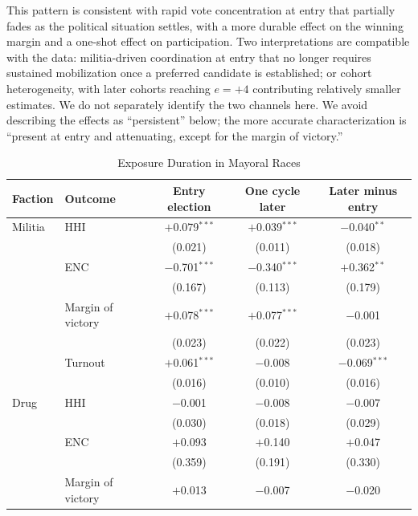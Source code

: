 \documentclass[11pt]{article}
\begin{document}
This pattern is consistent with rapid vote concentration at entry that partially fades as the political situation settles, with a more durable effect on the winning margin and a one-shot effect on participation. Two interpretations are compatible with the data: militia-driven coordination at entry that no longer requires sustained mobilization once a preferred candidate is established; or cohort heterogeneity, with later cohorts reaching $e=+4$ contributing relatively smaller estimates. We do not separately identify the two channels here. We avoid describing the effects as ``persistent'' below; the more accurate characterization is ``present at entry and attenuating, except for the margin of victory.''

\begin{table}[H]
\centering
\caption{Exposure Duration in Mayoral Races}\label{tab:duration}
\footnotesize
\begin{tabular}{@{}llccc@{}}
\toprule
Faction & Outcome & Entry election & One cycle later & Later minus entry \\
\midrule
Militia & HHI               & $+$0.079$^{***}$ & $+$0.039$^{***}$ & $-$0.040$^{**}$ \\
        &                   & (0.021)          & (0.011)          & (0.018) \\
        & ENC               & $-$0.701$^{***}$ & $-$0.340$^{***}$ & $+$0.362$^{**}$ \\
        &                   & (0.167)          & (0.113)          & (0.179) \\
        & Margin of victory & $+$0.078$^{***}$ & $+$0.077$^{***}$ & $-$0.001 \\
        &                   & (0.023)          & (0.022)          & (0.023) \\
        & Turnout           & $+$0.061$^{***}$ & $-$0.008         & $-$0.069$^{***}$ \\
        &                   & (0.016)          & (0.010)          & (0.016) \\
\midrule
Drug    & HHI               & $-$0.001         & $-$0.008         & $-$0.007 \\
        &                   & (0.030)          & (0.018)          & (0.029) \\
        & ENC               & $+$0.093         & $+$0.140         & $+$0.047 \\
        &                   & (0.359)          & (0.191)          & (0.330) \\
        & Margin of victory & $+$0.013         & $-$0.007         & $-$0.020 \\

\end{tabular}
\end{table}
\end{document}
